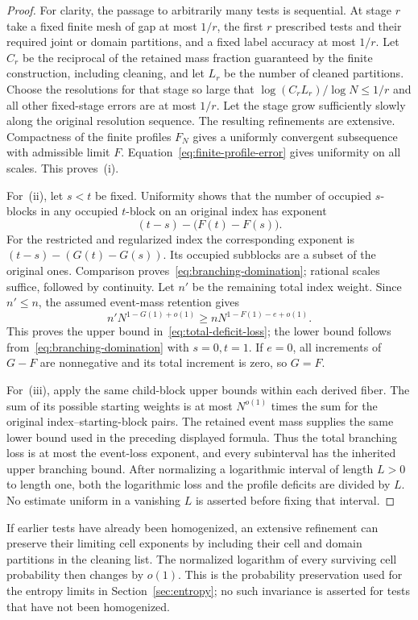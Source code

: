 \begin{proof}
For clarity, the passage to arbitrarily many tests is sequential.  At stage
$r$ take a fixed finite mesh of gap at most $1/r$, the first $r$ prescribed
tests and their required joint or domain partitions, and a fixed label
accuracy at most $1/r$.  Let $C_r$ be the reciprocal of the retained mass
fraction guaranteed by the finite construction, including cleaning, and
let $L_r$ be the number of cleaned partitions.  Choose
the resolutions for that stage so large that
$\log(C_rL_r)/\log N\le1/r$ and all other fixed-stage errors are at most
$1/r$.  Let the stage grow sufficiently slowly along the original
resolution sequence.  The resulting refinements are extensive.  Compactness
of the finite profiles $F_N$ gives a uniformly convergent subsequence with
admissible limit $F$.  Equation~\eqref{eq:finite-profile-error} gives
uniformity on all scales.  This proves~(i).

For~(ii), let $s<t$ be fixed.  Uniformity shows that the number of occupied
$s$-blocks in any occupied $t$-block on an original index has exponent
\[
 (t-s)-\bigl(F(t)-F(s)\bigr).
\]
For the restricted and regularized index the corresponding exponent is
$(t-s)-(G(t)-G(s))$.  Its occupied subblocks are a subset of the original
ones.  Comparison proves~\eqref{eq:branching-domination}; rational scales
suffice, followed by continuity.  Let $n'$ be the remaining total index
weight.  Since $n'\le n$, the assumed event-mass retention gives
\[
 n'N^{1-G(1)+o(1)}
 \ge nN^{1-F(1)-e+o(1)}.
\]
This proves the upper bound in~\eqref{eq:total-deficit-loss}; the lower bound
follows from~\eqref{eq:branching-domination} with $s=0,t=1$.  If $e=0$,
all increments of $G-F$ are nonnegative and its total increment is zero,
so $G=F$.

For~(iii), apply the same child-block upper bounds within each derived
fiber.  The sum of its possible starting weights is at most $N^{o(1)}$
times the sum for the original index--starting-block pairs.  The retained
event mass supplies the same lower bound used in the preceding displayed
formula.  Thus the total branching loss is at most the event-loss exponent,
and every subinterval has the inherited upper branching bound.  After
normalizing a logarithmic interval of length $L>0$ to length one, both the
logarithmic loss and the profile deficits are divided by $L$.  No estimate
uniform in a vanishing $L$ is asserted before fixing that interval.
\end{proof}

If earlier tests have already been homogenized, an extensive refinement
can preserve their limiting cell exponents by including their cell and
domain partitions in the cleaning list. The normalized logarithm of every
surviving cell probability then changes by $o(1)$. This is the probability
preservation used for the entropy limits in Section~\ref{sec:entropy};
no such invariance is asserted for tests that have not been homogenized.

